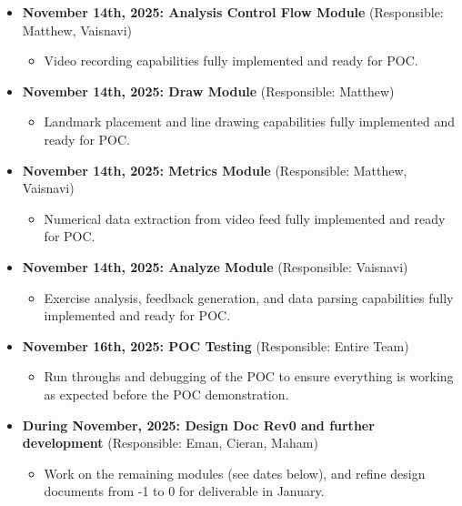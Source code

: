 \documentclass[12pt, titlepage]{article}
\begin{document}
\begin{itemize}
    \item \textbf{November 14th, 2025: Analysis Control Flow Module} (Responsible: Matthew, Vaisnavi)
    \begin{itemize}
        \item Video recording capabilities fully implemented and ready for POC.
    \end{itemize}

    \item \textbf{November 14th, 2025: Draw Module} (Responsible: Matthew)
    \begin{itemize}
        \item Landmark placement and line drawing capabilities fully implemented and ready for POC.
    \end{itemize}

    \item \textbf{November 14th, 2025: Metrics Module} (Responsible: Matthew, Vaisnavi)
    \begin{itemize}
        \item Numerical data extraction from video feed fully implemented and ready for POC.
    \end{itemize}

    \item \textbf{November 14th, 2025: Analyze Module} (Responsible: Vaisnavi)
    \begin{itemize}
        \item Exercise analysis, feedback generation, and data parsing capabilities fully implemented and ready for POC.
    \end{itemize}

    \item \textbf{November 16th, 2025: POC Testing} (Responsible: Entire Team)
    \begin{itemize}
        \item Run throughs and debugging of the POC to ensure everything is working as expected before the POC demonstration.
    \end{itemize}

    \item \textbf{During November, 2025: Design Doc Rev0 and further development} (Responsible: Eman, Cieran, Maham)
    \begin{itemize}
        \item Work on the remaining modules (see dates below), and refine design documents from -1 to 0 for deliverable in January.
    \end{itemize}


\end{itemize}
\end{document}
